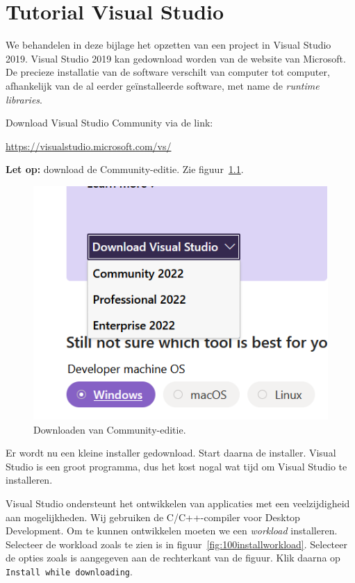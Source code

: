 \chapter{Tutorial Visual Studio}
\label{cha:visualstudio}
\thispagestyle{empty}

We behandelen in deze bijlage het opzetten van een project in Visual Studio 2019. Visual Studio 2019 kan gedownload worden van de website van Microsoft. De precieze installatie van de software verschilt van computer tot computer, afhankelijk van de al eerder geïnstalleerde software, met name de \textsl{runtime libraries}.

Download Visual Studio Community via de link:

\hspace*{1em}\url{https://visualstudio.microsoft.com/vs/}

\textbf{Let op:} download de Community-editie. Zie figuur~\ref{fig:100Adownloadcommunity}.

\begin{figure}[H]
\centering
\includegraphics[scale=\figscaleAA]{images/100Adownloadcommunity}
\caption{Downloaden van Community-editie.}
\label{fig:100Adownloadcommunity}
\end{figure}


Er wordt nu een kleine installer gedownload. Start daarna de installer. Visual Studio is een groot programma, dus het kost nogal wat tijd om Visual Studio te installeren.

Visual Studio ondersteunt het ontwikkelen van applicaties met een veelzijdigheid aan mogelijkheden. Wij gebruiken de C/C++-compiler voor Desktop Development. Om te kunnen ontwikkelen moeten we een \textsl{workload} installeren. Selecteer de workload zoals te zien is in figuur~\ref{fig:100installworkload}. Selecteer de opties zoals is aangegeven aan de rechterkant van de figuur. Klik daarna op \texttt{Install while downloading}.

